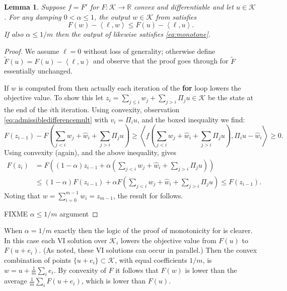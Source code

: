 \documentclass[letterpaper,final,12pt,reqno]{amsart}
\theoremstyle{cstyle}
\newtheorem{lemma}[theorem]{Lemma}
\theoremstyle{cstyle*}
\theoremstyle{dstyle}
\numberwithin{equation}{section}
\numberwithin{figure}{section}
\numberwithin{table}{section}
\numberwithin{theorem}{section}
\newcommand{\RR}{\mathbb{R}}
\newcommand{\cK}{\mathcal{K}}
\newcommand{\ip}[2]{\left<#1,#2\right>}
\begin{document}
\begin{lemma}  Suppose $f=F'$ for $F:\cK\to\RR$ convex and differentiable and let $u\in\cK$.  For any damping $0<\alpha\le 1$, the output $w \in \cK$ from  satisfies
\begin{equation}
F(w) - \ip{\ell}{w} \le F(u) - \ip{\ell}{u}.  \label{eq:monotone}
\end{equation}
If also $\alpha \le 1/m$ then the output of  likewise satisfies \eqref{eq:monotone}.
\end{lemma}

\begin{proof}  We assume $\ell=0$ without loss of generality; otherwise define $\tilde F(u)=F(u) - \ip{\ell}{u}$ and observe that the proof goes through for $\tilde F$ essentially unchanged.

If $w$ is computed from  then actually each iteration of the \textbf{for} loop lowers the objective value.  To show this let $z_{i} = \sum_{j\le i} w_j + \sum_{j > i} \Pi_j u \in \cK$ be the state at the end of the $i$th iteration.  Using convexity, observation \eqref{eq:admissibledifferencemult} with $v_i=\Pi_i u$, and the boxed inequality we find:
\begin{equation*}
F(z_{i-1}) - F\left(\sum_{j<i} w_j + \hat w_i + \sum_{j > i} \Pi_j u\right) \ge \ip{f\left(\sum_{j<i} w_j + \hat w_i + \sum_{j > i} \Pi_j u\right)}{\Pi_i u - \hat w_i} \ge 0.
\end{equation*}
Using convexity (again), and the above inequality, gives
\begin{align*}
F(z_i) &= F\left((1-\alpha) z_{i-1} + \alpha \left(\sum_{j<i} w_j + \hat w_i + \sum_{j > i} \Pi_j u\right)\right) \\
&\le  (1-\alpha) F(z_{i-1}) + \alpha F\left(\sum_{j<i} w_j + \hat w_i + \sum_{j > i} \Pi_j u\right) \le F(z_{i-1}).
\end{align*}
Noting that $w = \sum_{i=0}^{m-1} w_i = z_{m-1}$, the result for  follows.

FIXME $\alpha \le 1/m$ argument
\end{proof}

When $\alpha=1/m$ exactly then the logic of the proof of monotonicity for  is clearer.  In this case each VI solution over $\cK_i$ lowers the objective value from $F(u)$ to $F(u+e_i)$.  (As noted, these VI solutions can occur in parallel.)  Then the convex combination of points $\{u+e_i\} \subset \cK$, with equal coefficients $1/m$, is $w=u+\frac{1}{m}\sum_i e_i$.  By convexity of $F$ it follows that $F(w)$ is lower than the average $\frac{1}{m} \sum_i F(u+e_i)$, which is lower than $F(u)$.
\end{document}
